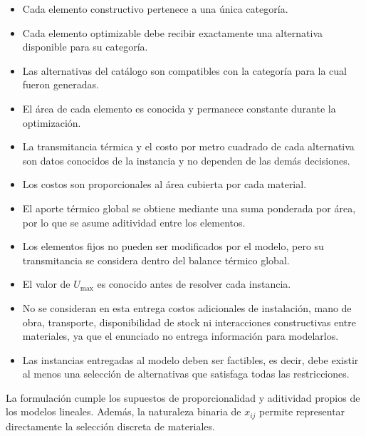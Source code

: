 \begin{itemize}
    \item Cada elemento constructivo pertenece a una única categoría.
    \item Cada elemento optimizable debe recibir exactamente una alternativa
    disponible para su categoría.
    \item Las alternativas del catálogo son compatibles con la categoría
    para la cual fueron generadas.
    \item El área de cada elemento es conocida y permanece constante durante
    la optimización.
    \item La transmitancia térmica y el costo por metro cuadrado de cada
    alternativa son datos conocidos de la instancia y no dependen de las
    demás decisiones.
    \item Los costos son proporcionales al área cubierta por cada material.
    \item El aporte térmico global se obtiene mediante una suma ponderada por
    área, por lo que se asume aditividad entre los elementos.
    \item Los elementos fijos no pueden ser modificados por el modelo, pero su
    transmitancia se considera dentro del balance térmico global.
    \item El valor de $U_{\max}$ es conocido antes de resolver cada instancia.
    \item No se consideran en esta entrega costos adicionales de instalación,
    mano de obra, transporte, disponibilidad de stock ni interacciones
    constructivas entre materiales, ya que el enunciado no entrega información
    para modelarlos.
    \item Las instancias entregadas al modelo deben ser factibles, es decir,
    debe existir al menos una selección de alternativas que satisfaga todas
    las restricciones.
\end{itemize}

La formulación cumple los supuestos de proporcionalidad y aditividad propios
de los modelos lineales. Además, la naturaleza binaria de $x_{ij}$ permite
representar directamente la selección discreta de materiales.

